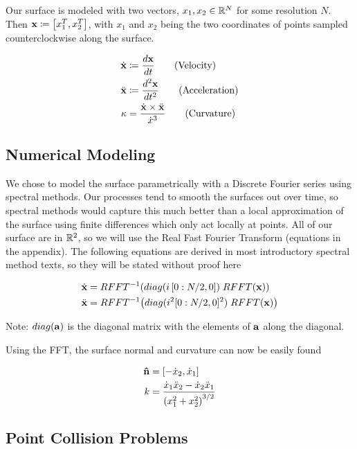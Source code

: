 Our surface is modeled with two vectors, $x_1, x_2 \in \mathbb R^N$ for some resolution $N$. Then $\bvec{x} \coloneqq \bracket{x_1^T, x_2^T}$, with $x_1$ and $x_2$ being the two coordinates of points sampled counterclockwise along the surface.

\begin{align}
  \dot{\mathbf{x}}& \coloneqq \frac{d\mathbf{x}}{dt} \tag{Velocity}\\
  \ddot{\mathbf{x}}& \coloneqq \frac{d^2\mathbf{x}}{dt^2} \tag{Acceleration}\\
  \kappa& = \frac{\dot{\mathbf{x}} \times \ddot{\mathbf{x}}}{\dot{x}^3} \tag{Curvature}
\end{align}

\subsection*{Numerical Modeling}

We chose to model the surface parametrically with a Discrete Fourier series using spectral methods. Our processes tend to smooth the surfaces out over time, so spectral methods would capture this much better than a local approximation of the surface using finite differences which only act locally at points. All of our surface are in $\mathbb R^2$, so we will use the Real Fast Fourier Transform (equations in the appendix). The following equations are derived in most introductory spectral method texts, so they will be stated without proof here

\begin{align}
  \dot{\bvec{x}}& = RFFT^{-1}\paren{diag(i \, [0:N/2, 0]) \; RFFT(\bvec{x})}\\
  \ddot{\bvec{x}}& = RFFT^{-1}\paren{diag(i^2 [0:N/2, 0]^2) \; RFFT(\bvec{x})}
\end{align}

Note: $diag(\mathbf{a})$ is the diagonal matrix with the elements of $\mathbf{a}$ along the diagonal.

Using the FFT, the surface normal and curvature can now be easily found

\begin{align}
  \bhat{n}& = [-\dot{x}_2, \dot{x}_1]\\
  k& = \frac{\dot{x}_1 \ddot{x}_2 - \dot{x}_2 \ddot{x}_1}{\paren{x_1^2 + x_2^2}^{3/2}}
\end{align}

\subsection*{Point Collision Problems}

